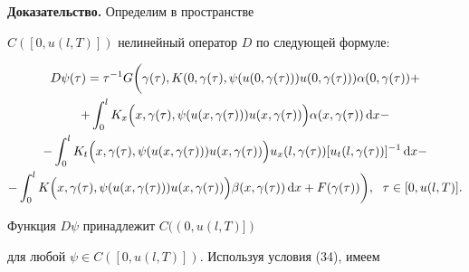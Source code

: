 {\bf Доказательство.} Определим в пространстве


$C([0,u(l,T)])$ нелинейный оператор $D$ по следующей формуле:


\begin{multline}


D\psi(\tau ) =\tau ^{-1}G\bigg(\gamma (\tau


),K(0,\gamma (\tau ),


\psi (u(0,\gamma (\tau )))u(0,\gamma (\tau )))\alpha


(0,\gamma (\tau ))+\\


+\int_0^lK_x\Big(x,\gamma (\tau ),\psi (u(x,\gamma(\tau )))


u(x,\gamma (\tau ))\Big)\alpha (x,\gamma (\tau ))\d x-\\


-\int_0^lK_t\Bigl(x,\gamma (\tau ),\psi (u(x,\gamma(\tau )))


u(x,\gamma(\tau))\Bigr)u_x(l,\gamma(\tau ))[u_t(l,\gamma


(\tau ))]^{-1}\d x-\\


- \int_0^lK\Big(x,\gamma (\tau ),\psi (u(x,\gamma (\tau)))


u(x,\gamma (\tau))\Big)\beta (x,\gamma (\tau))\d x+


F(\gamma (\tau ))\bigg),\ \; \tau \in [0,u(l,T)].




\end{multline}


Функция $D\psi$ принадлежит $C((0,u(l,T)])$


для любой $\psi \in C([0,u(l,T)])$. Используя условия (34), имеем


